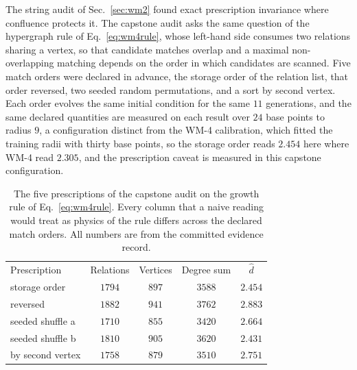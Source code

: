 \documentclass[aps,pre,reprint,nofootinbib]{revtex4-2}
\begin{document}
The string audit of Sec.~\ref{sec:wm2} found exact prescription
invariance where confluence protects it.  The capstone audit asks the
same question of the hypergraph rule of Eq.~\eqref{eq:wm4rule}, whose
left-hand side consumes two relations sharing a vertex, so that
candidate matches overlap and a maximal non-overlapping matching
depends on the order in which candidates are scanned.  Five match
orders were declared in advance, the storage order of the relation
list, that order reversed, two seeded random permutations, and a sort
by second vertex.  Each order evolves the same initial condition for
the same $11$ generations, and the same declared quantities are
measured on each result over $24$ base points to radius $9$, a
configuration distinct from the WM-4 calibration, which fitted the
training radii with thirty base points, so the storage order reads
$2.454$ here where WM-4 read $2.305$, and the prescription caveat is
measured in this capstone configuration.

\begin{table}[t]
\caption{The five prescriptions of the capstone audit on the growth
rule of Eq.~\eqref{eq:wm4rule}.  Every column that a naive reading
would treat as physics of the rule differs across the declared match
orders.  All numbers are from the committed evidence record.}
\label{tab:wm2h}
\begin{ruledtabular}
\begin{tabular}{lcccc}
Prescription & Relations & Vertices & Degree sum & $\hat d$ \\
\colrule
storage order    & $1794$ & $897$ & $3588$ & $2.454$ \\
reversed         & $1882$ & $941$ & $3762$ & $2.883$ \\
seeded shuffle a & $1710$ & $855$ & $3420$ & $2.664$ \\
seeded shuffle b & $1810$ & $905$ & $3620$ & $2.431$ \\
by second vertex & $1758$ & $879$ & $3510$ & $2.751$ \\
\end{tabular}
\end{ruledtabular}
\end{table}
\end{document}

